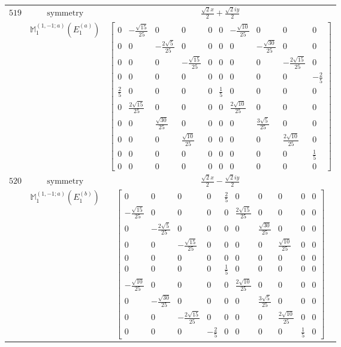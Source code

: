 \documentclass[fleqn,8pt,landscape]{jsarticle}
\begin{document}
\begin{longtable}{ccc}
$ 519 $ & $ \text{symmetry} $ & $ \frac{\sqrt{2} x}{2} + \frac{\sqrt{2} i y}{2} $ \\
$  $ & $ \mathbb{M}_{1}^{(1,-1;a)}(E_{1}^{(a)}) $ & $ \begin{bmatrix} 0 & - \frac{\sqrt{15}}{25} & 0 & 0 & 0 & 0 & - \frac{\sqrt{10}}{25} & 0 & 0 & 0 \\ 0 & 0 & - \frac{2 \sqrt{5}}{25} & 0 & 0 & 0 & 0 & - \frac{\sqrt{30}}{25} & 0 & 0 \\ 0 & 0 & 0 & - \frac{\sqrt{15}}{25} & 0 & 0 & 0 & 0 & - \frac{2 \sqrt{15}}{25} & 0 \\ 0 & 0 & 0 & 0 & 0 & 0 & 0 & 0 & 0 & - \frac{2}{5} \\ \frac{2}{5} & 0 & 0 & 0 & 0 & \frac{1}{5} & 0 & 0 & 0 & 0 \\ 0 & \frac{2 \sqrt{15}}{25} & 0 & 0 & 0 & 0 & \frac{2 \sqrt{10}}{25} & 0 & 0 & 0 \\ 0 & 0 & \frac{\sqrt{30}}{25} & 0 & 0 & 0 & 0 & \frac{3 \sqrt{5}}{25} & 0 & 0 \\ 0 & 0 & 0 & \frac{\sqrt{10}}{25} & 0 & 0 & 0 & 0 & \frac{2 \sqrt{10}}{25} & 0 \\ 0 & 0 & 0 & 0 & 0 & 0 & 0 & 0 & 0 & \frac{1}{5} \\ 0 & 0 & 0 & 0 & 0 & 0 & 0 & 0 & 0 & 0 \end{bmatrix} $ \\ \hline
$ 520 $ & $ \text{symmetry} $ & $ \frac{\sqrt{2} x}{2} - \frac{\sqrt{2} i y}{2} $ \\
$  $ & $ \mathbb{M}_{1}^{(1,-1;a)}(E_{1}^{(b)}) $ & $ \begin{bmatrix} 0 & 0 & 0 & 0 & \frac{2}{5} & 0 & 0 & 0 & 0 & 0 \\ - \frac{\sqrt{15}}{25} & 0 & 0 & 0 & 0 & \frac{2 \sqrt{15}}{25} & 0 & 0 & 0 & 0 \\ 0 & - \frac{2 \sqrt{5}}{25} & 0 & 0 & 0 & 0 & \frac{\sqrt{30}}{25} & 0 & 0 & 0 \\ 0 & 0 & - \frac{\sqrt{15}}{25} & 0 & 0 & 0 & 0 & \frac{\sqrt{10}}{25} & 0 & 0 \\ 0 & 0 & 0 & 0 & 0 & 0 & 0 & 0 & 0 & 0 \\ 0 & 0 & 0 & 0 & \frac{1}{5} & 0 & 0 & 0 & 0 & 0 \\ - \frac{\sqrt{10}}{25} & 0 & 0 & 0 & 0 & \frac{2 \sqrt{10}}{25} & 0 & 0 & 0 & 0 \\ 0 & - \frac{\sqrt{30}}{25} & 0 & 0 & 0 & 0 & \frac{3 \sqrt{5}}{25} & 0 & 0 & 0 \\ 0 & 0 & - \frac{2 \sqrt{15}}{25} & 0 & 0 & 0 & 0 & \frac{2 \sqrt{10}}{25} & 0 & 0 \\ 0 & 0 & 0 & - \frac{2}{5} & 0 & 0 & 0 & 0 & \frac{1}{5} & 0 \end{bmatrix} $ \\ \hline

\end{longtable}
\end{document}
